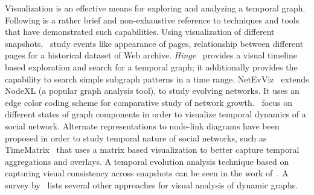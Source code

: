 \documentclass[graybox, natbib, nosecnum, twocolumn]{svmult}
\begin{document}
Visualization is an effective means for exploring and analyzing a temporal graph. Following is a rather brief and non-exhaustive reference to techniques and tools that have demonstrated such capabilities. 
Using visualization of different snapshots,~\cite{toyoda2005system} study events like appearance of pages, relationship between different pages for a historical dataset of Web archive. 
{\em Hinge}~\citep{khurana2013hinge} provides a visual timeline based exploration and search for a temporal graph; it additionally provides the capability to search simple subgraph patterns in a time range.
NetEvViz~\citep{khurana2011visual} extends NodeXL (a popular graph analysis tool), to study evolving networks. It uses an edge color coding scheme for comparative study of network growth.~\cite{ahn2011temporal} focus on different states of graph components in order to visualize temporal dynamics of a social network.
Alternate representations to node-link diagrams have been proposed in order to study temporal nature of social networks, such as TimeMatrix~\citep{yi2010timematrix} that uses a matrix based visualization to better capture temporal aggregations and overlays. A temporal evolution analysis technique based on capturing visual consistency across snapshots can be seen in the work of~\citet{xu2011visualizing}.
A survey by~\cite{beck2014state} lists several other approaches for visual analysis of dynamic graphs. 
\end{document}
